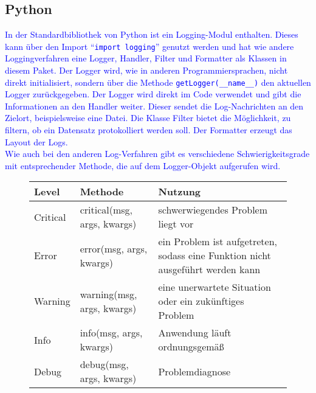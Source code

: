 \subsection{Python}\label{subsec:python}
\textcolor{blue}{
    In der Standardbibliothek von Python ist ein Logging-Modul enthalten.
    Dieses kann über den Import \enquote{\texttt{import logging}} genutzt werden und hat wie andere Loggingverfahren eine Logger, Handler, Filter und Formatter als Klassen in diesem Paket.
    Der Logger wird, wie in anderen Programmiersprachen, nicht direkt initialisiert, sondern über die Methode \texttt{getLogger(\_\_name\_\_)} den aktuellen Logger zurückgegeben.
    Der Logger wird direkt im Code verwendet und gibt die Informationen an den Handler weiter.
    Dieser sendet die Log-Nachrichten an den Zielort, beispielsweise eine Datei.
    Die Klasse Filter bietet die Möglichkeit, zu filtern, ob ein Datensatz protokolliert werden soll.
    Der Formatter erzeugt das Layout der Logs.
    \\
    Wie auch bei den anderen Log-Verfahren gibt es verschiedene Schwierigkeitsgrade mit entsprechender Methode, die auf dem Logger-Objekt aufgerufen wird.
    \\
    \begin{figure}[h]
        \centering
        \textcolor{blue}{
            \begin{tabular}[h]{|p{1.5cm}|p{5cm}|p{6cm}|}
                \rowcolor{gray!50}
                \hline
                Level    & Methode                       & Nutzung                                                                        \\
                \hline
                Critical & critical(msg, args, kwargs)   & schwerwiegendes Problem liegt vor                                              \\
                \hline
                Error    & error(msg, args, kwargs)      & ein Problem ist aufgetreten, sodass eine Funktion nicht ausgeführt werden kann \\
                \hline
                Warning  & warning(msg, args, kwargs)    & eine unerwartete Situation oder ein zukünftiges Problem                        \\
                \hline
                Info     & info(msg, args, kwargs)       & Anwendung läuft ordnungsgemäß                                                  \\
                \hline
                Debug    & debug(msg, args, kwargs)      & Problemdiagnose                                                                \\

\end{tabular}}
\end{figure}}
